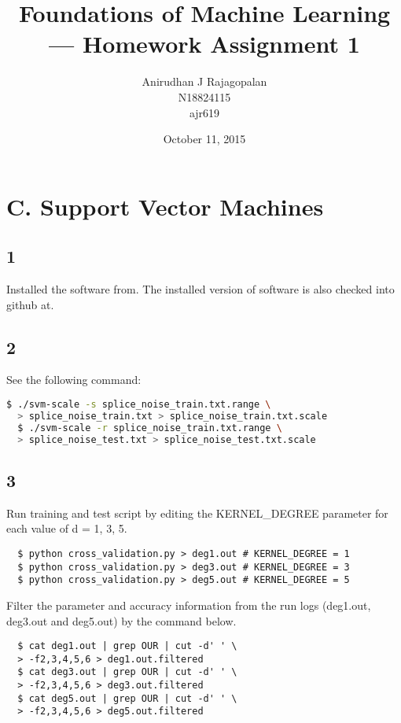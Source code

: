 \documentclass{article}
\begin{document}
\title{Foundations of Machine Learning --- Homework Assignment 1}
\date{October 11, 2015}
\author{Anirudhan J Rajagopalan\\ N18824115\\ ajr619}

\maketitle

\newpage

\section*{C. Support Vector Machines}
\subsection*{1}
Installed the software from\cite{libsvm}.  The installed version of software is also checked into github at\cite{githuburl}. 
\subsection*{2}

\noindent See the following command:
\begin{lstlisting}[language=bash]
  $ ./svm-scale -s splice_noise_train.txt.range \ 
  > splice_noise_train.txt > splice_noise_train.txt.scale
  $ ./svm-scale -r splice_noise_train.txt.range \
  > splice_noise_test.txt > splice_noise_test.txt.scale
\end{lstlisting}

\subsection*{3}
Run training and test script\cite{cvscript} by editing the KERNEL\_DEGREE parameter for each value of d = 1, 3, 5.
\begin{lstlisting}
  $ python cross_validation.py > deg1.out # KERNEL_DEGREE = 1
  $ python cross_validation.py > deg3.out # KERNEL_DEGREE = 3
  $ python cross_validation.py > deg5.out # KERNEL_DEGREE = 5
\end{lstlisting}

Filter the parameter and accuracy information from the run logs (deg1.out, deg3.out and deg5.out) by the command below.
\begin{lstlisting}
  $ cat deg1.out | grep OUR | cut -d' ' \
  > -f2,3,4,5,6 > deg1.out.filtered
  $ cat deg3.out | grep OUR | cut -d' ' \
  > -f2,3,4,5,6 > deg3.out.filtered
  $ cat deg5.out | grep OUR | cut -d' ' \
  > -f2,3,4,5,6 > deg5.out.filtered
\end{lstlisting}
\end{document}
